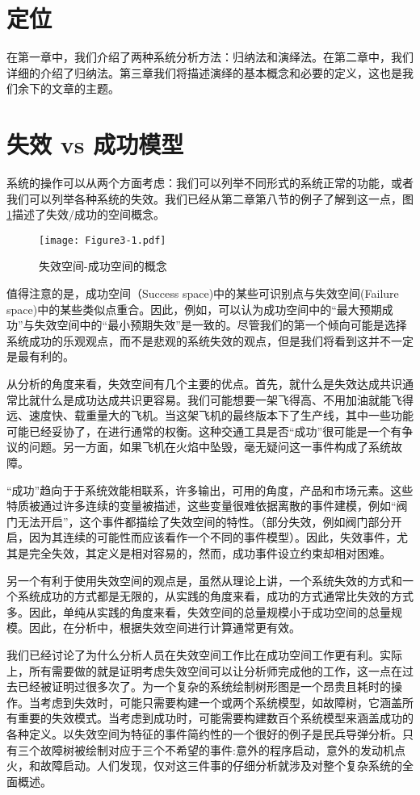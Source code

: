 \documentclass[cn,11pt,chinese]{elegantbook}
\begin{document}
\section{定位}

在第一章中，我们介绍了两种系统分析方法：归纳法和演绎法。在第二章中，我们详细的介绍了归纳法。第三章我们将描述演绎的基本概念和必要的定义，这也是我们余下的文章的主题。

\section{失效 vs 成功模型}

系统的操作可以从两个方面考虑：我们可以列举不同形式的系统正常的功能，或者我们可以列举各种系统的失效。我们已经从第二章第八节的例子了解到这一点，图\ref{fig:fig3_1}描述了失效/成功的空间概念。

\begin{figure}[h]
	\centering
	\texttt{[image: Figure3-1.pdf]}
		\caption{失效空间-成功空间的概念}\label{fig:fig3_1}
\end{figure}

值得注意的是，成功空间（Success space)中的某些可识别点与失效空间(Failure space)中的某些类似点重合。因此，例如，可以认为成功空间中的“最大预期成功”与失效空间中的“最小预期失效”是一致的。尽管我们的第一个倾向可能是选择系统成功的乐观观点，而不是悲观的系统失效的观点，但是我们将看到这并不一定是最有利的。

从分析的角度来看，失效空间有几个主要的优点。首先，就什么是失效达成共识通常比就什么是成功达成共识更容易。我们可能想要一架飞得高、不用加油就能飞得远、速度快、载重量大的飞机。当这架飞机的最终版本下了生产线，其中一些功能可能已经妥协了，在进行通常的权衡。这种交通工具是否“成功”很可能是一个有争议的问题。另一方面，如果飞机在火焰中坠毁，毫无疑问这一事件构成了系统故障。

“成功”趋向于于系统效能相联系，许多输出，可用的角度，产品和市场元素。这些特质被通过许多连续的变量被描述，这些变量很难依据离散的事件建模，例如“阀门无法开启”，这个事件都描绘了失效空间的特性。（部分失效，例如阀门部分开启，因为其连续的可能性而应该看作一个不同的事件模型）。因此，失效事件，尤其是完全失效，其定义是相对容易的，然而，成功事件设立约束却相对困难。

另一个有利于使用失效空间的观点是，虽然从理论上讲，一个系统失效的方式和一个系统成功的方式都是无限的，从实践的角度来看，成功的方式通常比失效的方式多。因此，单纯从实践的角度来看，失效空间的总量规模小于成功空间的总量规模。因此，在分析中，根据失效空间进行计算通常更有效。

我们已经讨论了为什么分析人员在失效空间工作比在成功空间工作更有利。实际上，所有需要做的就是证明考虑失效空间可以让分析师完成他的工作，这一点在过去已经被证明过很多次了。为一个复杂的系统绘制树形图是一个昂贵且耗时的操作。当考虑到失效时，可能只需要构建一个或两个系统模型，如故障树，它涵盖所有重要的失效模式。当考虑到成功时，可能需要构建数百个系统模型来涵盖成功的各种定义。以失效空间为特征的事件简约性的一个很好的例子是民兵导弹分析。只有三个故障树被绘制对应于三个不希望的事件:意外的程序启动，意外的发动机点火，和故障启动。人们发现，仅对这三件事的仔细分析就涉及对整个复杂系统的全面概述。
\end{document}
